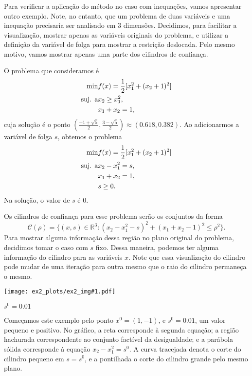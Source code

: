 \newpage
Para verificar a aplicação do método no caso com inequações, vamos apresentar
outro exemplo. Note, no entanto, que um problema de duas variáveis e uma
inequação precisaria ser analisado em 3 dimensões. Decidimos, para facilitar a
visualização, mostrar apenas as variáveis originais do problema, e utilizar a
definição da variável de folga para mostrar a restrição deslocada.
Pelo mesmo motivo, vamos mostrar apenas uma parte dos cilindros de confiança.

O problema que consideramos é
\begin{eqnarray}
  \min & f(x) = \frac{1}{2}[x_1^2 + (x_2+1)^2] \nonumber \\
  \mbox{suj. a} & x_2 \geq x_1^2, \nonumber \\
               & x_1 + x_2 = 1, \nonumber
\end{eqnarray}
cuja solução é o ponto $(\frac{-1+\sqrt{5}}{2},\frac{3-\sqrt{5}}{2}) \approx
(0.618,0.382)$.
Ao adicionarmos a variável de folga $s$, obtemos o problema
\begin{eqnarray}
  \min & f(x) = \frac{1}{2}[x_1^2 + (x_2+1)^2] \nonumber \\
  \mbox{suj. a} & x_2 - x_1^2 = s, \nonumber \\
               & x_1 + x_2 = 1, \nonumber \\
               & s \geq 0. \nonumber
\end{eqnarray}
Na solução, o valor de $s$ é $0$.

Os cilindros de confiança para esse problema serão os conjuntos da forma
$$ \mathcal{C}(\rho) = \{(x,s) \in \mathbb{R}^3: (x_2 - x_1^2 - s)^2 +
  (x_1+x_2-1)^2 \leq \rho^2\}. $$
Para mostrar alguma informação dessa região no plano original do problema,
decidimos tomar o caso com $s$ fixo. Dessa maneira, podemos ter alguma
informação do cilindro para as variáveis $x$. Note que essa visualização do
cilindro pode mudar de uma iteração para outra mesmo que o raio do cilindro
permaneça o mesmo.

\newcommand{\addexdois}[1]{
  \texttt{[image: ex2\_plots/ex2\_img\#1.pdf]}
}

\begin{center}
  \addexdois{1}

  $s^0 = 0.01$
\end{center}

\begin{center}
  \begin{minipage}{0.9\textwidth}
    Começamos este exemplo pelo ponto $x^0 = (1,-1)$, e $s^0 = 0.01$, um valor
    pequeno e positivo.
    No gráfico, a reta corresponde à segunda equação; a região hachurada
    correspondente ao conjunto factível da desigualdade; e a parábola sólida
    corresponde à equação $x_2 - x_1^2 = s^0$.
    A curva tracejada denota o corte do cilindro pequeno em $s = s^0$, e a
    pontilhada o corte do cilindro grande pelo mesmo plano.
\end{minipage}
\end{center}

